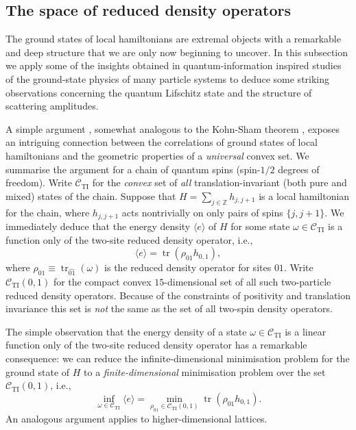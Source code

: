\documentclass[twocolumn,lengthcheck,superscriptaddress]{revtex4-1}
\newcommand{\tr}{\operatorname{tr}}
\theoremstyle{definition}
\theoremstyle{remark}
\begin{document}
\subsection{The space of reduced density operators}
The ground states of local hamiltonians are extremal objects with a remarkable and deep structure that we are only now beginning to uncover. In this subsection we apply some of the insights obtained in quantum-information inspired studies of the ground-state physics of many particle systems to deduce some striking observations concerning the quantum Lifschitz state and the structure of scattering amplitudes. 

A simple argument \cite{verstraete:2005a}, somewhat analogous to the Kohn-Sham theorem \cite{hohenberg:1964a,kohn:1965a}, exposes an intriguing connection between the correlations of ground states of local  hamiltonians and the geometric properties of a \emph{universal} convex set. We summarise the argument for a chain of quantum spins (spin-$1/2$ degrees of freedom). Write $\mathcal{C}_{\text{TI}}$ for the \emph{convex} set of \emph{all} translation-invariant (both pure and mixed) states of the chain. Suppose that $H = \sum_{j\in\mathbb{Z}} h_{j,j+1}$ is a local hamiltonian for the chain, where $h_{j,j+1}$ acts nontrivially on only pairs of spins $\{j,j+1\}$. We immediately deduce that the energy density $\langle e \rangle$ of $H$ for some state $\omega\in \mathcal{C}_{\text{TI}}$ is a function only of the two-site reduced density operator, i.e., 
\begin{equation}
	\langle e \rangle = \tr(\rho_{01} h_{0,1}),
\end{equation}
where $\rho_{01} \equiv \tr_{\widehat{01}}(\omega)$ is the reduced density operator for sites $01$. Write $\mathcal{C}_{\text{TI}}(0,1)$ for the compact convex $15$-dimensional set of all such two-particle reduced density operators. Because of the constraints of positivity and translation invariance this set is \emph{not} the same as the set of all two-spin density operators.

The simple observation that the energy density of a state $\omega\in \mathcal{C}_{\text{TI}}$ is a linear function only of the two-site reduced density operator has a remarkable consequence: we can reduce the infinite-dimensional minimisation problem for the ground state of $H$ to a \emph{finite-dimensional} minimisation problem over the set $\mathcal{C}_{\text{TI}}(0,1)$, i.e.,
\begin{equation}
	\inf_{\omega\in \mathcal{C}_{\text{TI}}} \langle e \rangle = \min_{\rho_{01}\in \mathcal{C}_{\text{TI}}(0,1)} \tr(\rho_{01} h_{0,1}).
\end{equation}
An analogous argument applies to higher-dimensional lattices.
\end{document}
